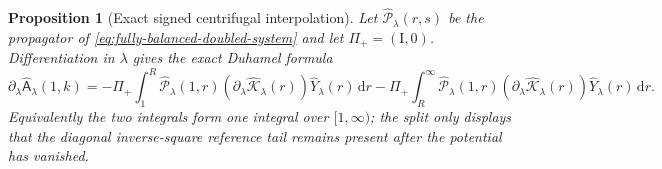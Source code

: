 \documentclass[11pt]{article}
\newcommand{\Id}{\mathrm I}
\newcommand{\dd}{\,\mathrm d}
\newtheorem{proposition}[theorem]{Proposition}
\theoremstyle{definition}
\theoremstyle{remark}
\begin{document}
\begin{proposition}[Exact signed centrifugal interpolation]
Let $\widehat{\mathcal P}_\lambda(r,s)$ be the propagator of
\eqref{eq:fully-balanced-doubled-system} and let
$\Pi_+=(\Id,0)$.  Differentiation in $\lambda$ gives the exact Duhamel formula
\begin{equation}
 \partial_\lambda\widehat{\mathsf A}_\lambda(1,k)
 =-\Pi_+\int_1^R
   \widehat{\mathcal P}_\lambda(1,r)
   (\partial_\lambda\widehat{\mathcal K}_\lambda(r))
   \widehat Y_\lambda(r)\dd r
 -\Pi_+\int_R^\infty
   \widehat{\mathcal P}_\lambda(1,r)
   (\partial_\lambda\widehat{\mathcal K}_\lambda(r))
   \widehat Y_\lambda(r)\dd r.
 \label{eq:balanced-centrifugal-A-duhamel}
\end{equation}
Equivalently the two integrals form one integral over $[1,\infty)$; the split
only displays that the diagonal inverse-square reference tail remains present
after the potential has vanished.


\end{proposition}
\end{document}
